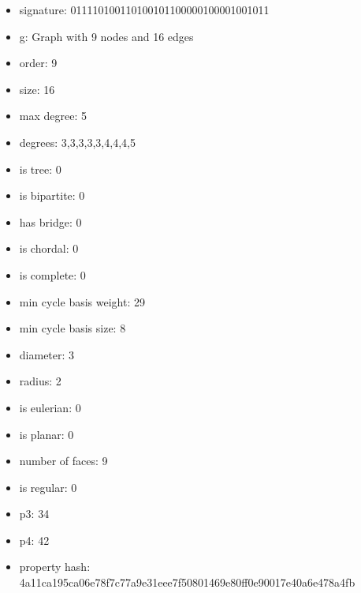 \newpage
\begin{figure}
\end{figure}
\begin{itemize}
\item signature: 011110100110100101100000100001001011
\item g: Graph with 9 nodes and 16 edges
\item order: 9
\item size: 16
\item max degree: 5
\item degrees: 3,3,3,3,3,4,4,4,5
\item is tree: 0
\item is bipartite: 0
\item has bridge: 0
\item is chordal: 0
\item is complete: 0
\item min cycle basis weight: 29
\item min cycle basis size: 8
\item diameter: 3
\item radius: 2
\item is eulerian: 0
\item is planar: 0
\item number of faces: 9
\item is regular: 0
\item p3: 34
\item p4: 42
\item property hash: 4a11ca195ca06e78f7c77a9e31eee7f50801469e80ff0e90017e40a6e478a4fb
\end{itemize}
